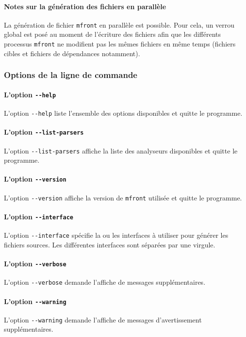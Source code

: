\documentclass[rectoverso,pleiades,pstricks,leqno,anti]{texmf/note_technique_2010}
\newcommand{\mfront}{\texttt{mfront}}
\newcommand{\moption}[1]{\texttt{-{}-#1}}
\begin{document}
\paragraph{Notes sur la génération des fichiers en parallèle} La
génération de fichier \mfront{} en parallèle est possible. Pour cela, un
verrou global est posé au moment de l'écriture des fichiers afin que les
différents processus \mfront{} ne modifient pas les mêmes fichiers en
même temps (fichiers cibles et fichiers de dépendances notamment).

\subsubsection{Options de la ligne de commande}

\paragraph{L'option \moption{help}} L'option \moption{help} liste
l'ensemble des options disponibles et quitte le programme.

\paragraph{L'option \moption{list-parsers}} L'option
\moption{list-parsers} affiche la liste des analyseurs disponibles et
quitte le programme.

\paragraph{L'option \moption{version}} L'option \moption{version}
affiche la version de \mfront{} utilisée et quitte le programme.

\paragraph{L'option \moption{interface}} L'option \moption{interface}
spécifie la ou les interfaces à utiliser pour générer les fichiers
sources. Les différentes interfaces sont séparées par une virgule.

\paragraph{L'option \moption{verbose}} L'option \moption{verbose}
demande l'affiche de messages supplémentaires.

\paragraph{L'option \moption{warning}} L'option \moption{warning}
demande l'affiche de messages d'avertissement supplémentaires.
\end{document}
